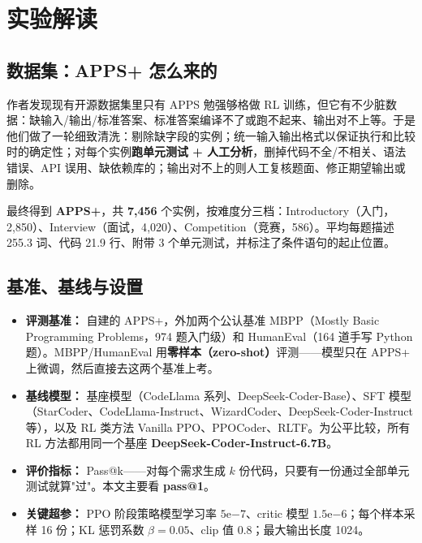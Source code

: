 \documentclass[11pt,UTF8,fontset=fandol]{ctexart}
\begin{document}
\section{实验解读}

\subsection{数据集：APPS+ 怎么来的}

作者发现现有开源数据集里只有 APPS 勉强够格做 RL 训练，但它有不少脏数据：缺输入/输出/标准答案、标准答案编译不了或跑不起来、输出对不上等。于是他们做了一轮细致清洗：剔除缺字段的实例；统一输入输出格式以保证执行和比较时的确定性；对每个实例\textbf{跑单元测试 + 人工分析}，删掉代码不全/不相关、语法错误、API 误用、缺依赖库的；输出对不上的则人工复核题面、修正期望输出或删除。

最终得到 \textbf{APPS+}，共 \textbf{7{,}456} 个实例，按难度分三档：Introductory（入门，2{,}850）、Interview（面试，4{,}020）、Competition（竞赛，586）。平均每题描述 255.3 词、代码 21.9 行、附带 3 个单元测试，并标注了条件语句的起止位置。

\subsection{基准、基线与设置}

\begin{itemize}[leftmargin=2em]
\item \textbf{评测基准：} 自建的 APPS+，外加两个公认基准 MBPP（Mostly Basic Programming Problems，974 题入门级）和 HumanEval（164 道手写 Python 题）。MBPP/HumanEval 用\textbf{零样本（zero-shot）}评测——模型只在 APPS+ 上微调，然后直接去这两个基准上考。
\item \textbf{基线模型：} 基座模型（CodeLlama 系列、DeepSeek-Coder-Base）、SFT 模型（StarCoder、CodeLlama-Instruct、WizardCoder、DeepSeek-Coder-Instruct 等），以及 RL 类方法 Vanilla PPO、PPOCoder、RLTF。为公平比较，所有 RL 方法都用同一个基座 \textbf{DeepSeek-Coder-Instruct-6.7B}。
\item \textbf{评价指标：} Pass@k——对每个需求生成 $k$ 份代码，只要有一份通过全部单元测试就算"过"。本文主要看 \textbf{pass@1}。
\item \textbf{关键超参：} PPO 阶段策略模型学习率 $5\mathrm{e}{-7}$、critic 模型 $1.5\mathrm{e}{-6}$；每个样本采样 16 份；KL 惩罚系数 $\beta = 0.05$、clip 值 0.8；最大输出长度 1024。
\end{itemize}
\end{document}
